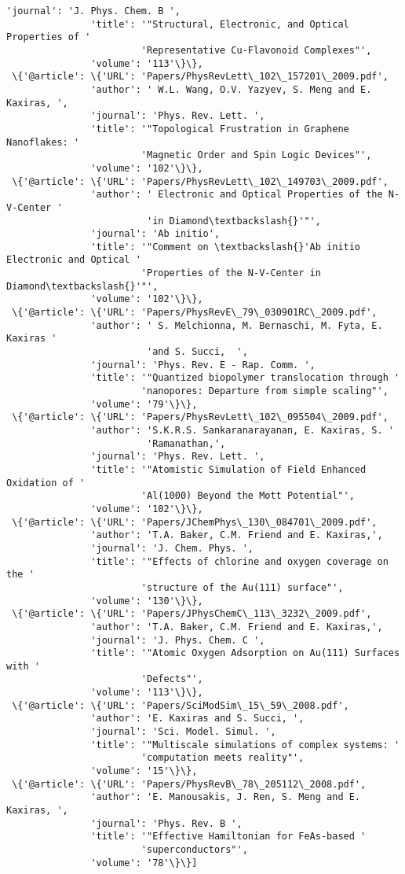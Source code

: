 \documentclass[11pt]{article}
\begin{document}
\begin{Verbatim}[commandchars=\\\{\}]
               'journal': 'J. Phys. Chem. B ',
               'title': '"Structural, Electronic, and Optical Properties of '
                        'Representative Cu-Flavonoid Complexes"',
               'volume': '113'\}\},
 \{'@article': \{'URL': 'Papers/PhysRevLett\_102\_157201\_2009.pdf',
               'author': ' W.L. Wang, O.V. Yazyev, S. Meng and E. Kaxiras, ',
               'journal': 'Phys. Rev. Lett. ',
               'title': '"Topological Frustration in Graphene Nanoflakes: '
                        'Magnetic Order and Spin Logic Devices"',
               'volume': '102'\}\},
 \{'@article': \{'URL': 'Papers/PhysRevLett\_102\_149703\_2009.pdf',
               'author': ' Electronic and Optical Properties of the N-V-Center '
                         'in Diamond\textbackslash{}'"',
               'journal': 'Ab initio',
               'title': '"Comment on \textbackslash{}'Ab initio Electronic and Optical '
                        'Properties of the N-V-Center in Diamond\textbackslash{}'"',
               'volume': '102'\}\},
 \{'@article': \{'URL': 'Papers/PhysRevE\_79\_030901RC\_2009.pdf',
               'author': ' S. Melchionna, M. Bernaschi, M. Fyta, E. Kaxiras '
                         'and S. Succi,  ',
               'journal': 'Phys. Rev. E - Rap. Comm. ',
               'title': '"Quantized biopolymer translocation through '
                        'nanopores: Departure from simple scaling"',
               'volume': '79'\}\},
 \{'@article': \{'URL': 'Papers/PhysRevLett\_102\_095504\_2009.pdf',
               'author': 'S.K.R.S. Sankaranarayanan, E. Kaxiras, S. '
                         'Ramanathan,',
               'journal': 'Phys. Rev. Lett. ',
               'title': '"Atomistic Simulation of Field Enhanced Oxidation of '
                        'Al(1000) Beyond the Mott Potential"',
               'volume': '102'\}\},
 \{'@article': \{'URL': 'Papers/JChemPhys\_130\_084701\_2009.pdf',
               'author': 'T.A. Baker, C.M. Friend and E. Kaxiras,',
               'journal': 'J. Chem. Phys. ',
               'title': '"Effects of chlorine and oxygen coverage on the '
                        'structure of the Au(111) surface"',
               'volume': '130'\}\},
 \{'@article': \{'URL': 'Papers/JPhysChemC\_113\_3232\_2009.pdf',
               'author': 'T.A. Baker, C.M. Friend and E. Kaxiras,',
               'journal': 'J. Phys. Chem. C ',
               'title': '"Atomic Oxygen Adsorption on Au(111) Surfaces with '
                        'Defects"',
               'volume': '113'\}\},
 \{'@article': \{'URL': 'Papers/SciModSim\_15\_59\_2008.pdf',
               'author': 'E. Kaxiras and S. Succi, ',
               'journal': 'Sci. Model. Simul. ',
               'title': '"Multiscale simulations of complex systems: '
                        'computation meets reality"',
               'volume': '15'\}\},
 \{'@article': \{'URL': 'Papers/PhysRevB\_78\_205112\_2008.pdf',
               'author': 'E. Manousakis, J. Ren, S. Meng and E. Kaxiras, ',
               'journal': 'Phys. Rev. B ',
               'title': '"Effective Hamiltonian for FeAs-based '
                        'superconductors"',
               'volume': '78'\}\}]

    \end{Verbatim}
\end{document}
